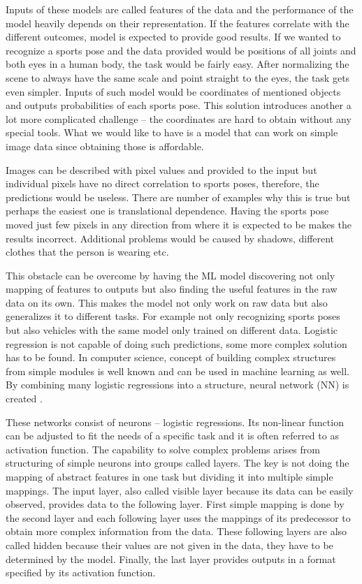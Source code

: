 Inputs of these models are called features of the data and the performance of the model heavily depends on their representation. If the features correlate with the different outcomes, model is expected to provide good results. If we wanted to recognize a sports pose and the data provided would be positions of all joints and both eyes in a human body, the task would be fairly easy. After normalizing the scene to always have the same scale and point straight to the eyes, the task gets even simpler. Inputs of such model would be coordinates of mentioned objects and outputs probabilities of each sports pose. This solution introduces another a lot more complicated challenge -- the coordinates are hard to obtain without any special tools. What we would like to have is a model that can work on simple image data since obtaining those is affordable.

Images can be described with pixel values and provided to the input but individual pixels have no direct correlation to sports poses, therefore, the predictions would be useless. There are number of examples why this is true but perhaps the easiest one is translational dependence. Having the sports pose moved just few pixels in any direction from where it is expected to be makes the results incorrect. Additional problems would be caused by shadows, different clothes that the person is wearing etc.

This obstacle can be overcome by having the ML model discovering not only mapping of features to outputs but also finding the useful features in the raw data on its own. This makes the model not only work on raw data but also generalizes it to different tasks. For example not only recognizing sports poses but also vehicles with the same model only trained on different data. Logistic regression is not capable of doing such predictions, some more complex solution has to be found. In computer science, concept of building complex structures from simple modules is well known and can be used in machine learning as well. By combining many logistic regressions into a structure, neural network (NN) is created \cite{Goodfellow-et-al-2016}.

These networks consist of neurons -- logistic regressions. Its non-linear function can be adjusted to fit the needs of a specific task and it is often referred to as activation function. The capability to solve complex problems arises from structuring of simple neurons into groups called layers. The key is not doing the mapping of abstract features in one task but dividing it into multiple simple mappings. The input layer, also called visible layer because its data can be easily observed, provides data to the following layer. First simple mapping is done by the second layer and each following layer uses the mappings of its predecessor to obtain more complex information from the data. These following layers are also called hidden because their values are not given in the data, they have to be determined by the model. Finally, the last layer provides outputs in a format specified by its activation function.

